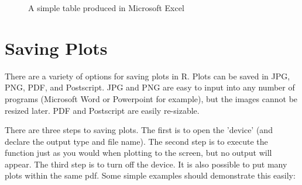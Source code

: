 \documentclass[a4paper,11pt]{article}\usepackage{graphicx, color}
\begin{document}
\begin{figure}[ht!]
\centering
\caption{A simple table produced in Microsoft Excel}
\label{overflow}
\end{figure}

\section{Saving Plots}
\label{app:savingPlots}
There are a variety of options for saving plots in R. Plots can be saved in JPG, PNG, PDF, and Postscript. JPG and PNG are easy to input into any number of programs (Microsoft Word or Powerpoint for example), but the images cannot be resized later. PDF and Postscript are easily re-sizable.

There are three steps to saving plots. The first is to open the 'device' (and declare the output type and file name). The second step is to execute the function just as you would when plotting to the screen, but no output will appear. The third step is to turn off the device. It is also possible to put many plots within the same pdf.  Some simple examples should demonstrate this easily:
\end{document}
